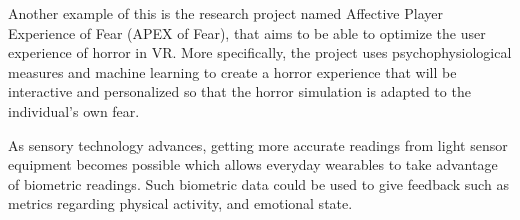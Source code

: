Another example of this is the research project named Affective Player Experience of Fear (APEX of Fear), that aims to be able to optimize the user experience of horror in VR\cite{ApexOfFear}. 
More specifically, the project uses psychophysiological measures and machine learning to create a horror experience that will be interactive and personalized so that the horror simulation is adapted to the individual's own fear.


As sensory technology advances, getting more accurate readings from light sensor equipment becomes possible which allows everyday wearables to take advantage of biometric readings. Such biometric data could be used to give feedback such as metrics regarding physical activity, and emotional state.